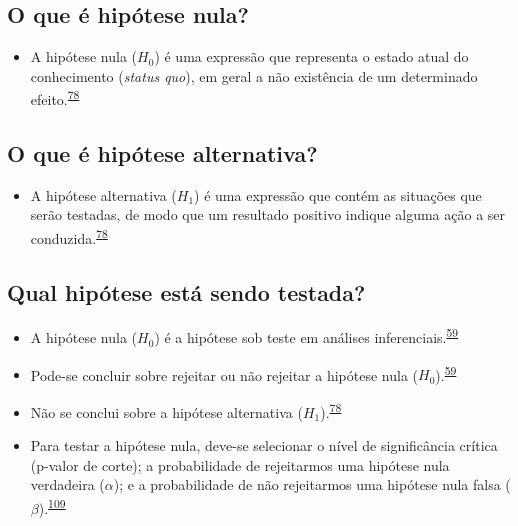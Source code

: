 \documentclass[
  a4paper,
]{book}
\providecommand{\tightlist}{%
  \setlength{\itemsep}{0pt}\setlength{\parskip}{0pt}}
\begin{document}
\hypertarget{o-que-uxe9-hipuxf3tese-nula}{%
\subsection{O que é hipótese nula?}\label{o-que-uxe9-hipuxf3tese-nula}}

\begin{itemize}
\tightlist
\item
  A hipótese nula (\(H_{0}\)) é uma expressão que representa o estado atual do conhecimento (\emph{status quo}), em geral a não existência de um determinado efeito.\textsuperscript{\protect\hyperlink{ref-kanji2006}{78}}
\end{itemize}

\hypertarget{o-que-uxe9-hipuxf3tese-alternativa}{%
\subsection{O que é hipótese alternativa?}\label{o-que-uxe9-hipuxf3tese-alternativa}}

\begin{itemize}
\tightlist
\item
  A hipótese alternativa (\(H_{1}\)) é uma expressão que contém as situações que serão testadas, de modo que um resultado positivo indique alguma ação a ser conduzida.\textsuperscript{\protect\hyperlink{ref-kanji2006}{78}}
\end{itemize}

\hypertarget{qual-hipuxf3tese-estuxe1-sendo-testada}{%
\subsection{Qual hipótese está sendo testada?}\label{qual-hipuxf3tese-estuxe1-sendo-testada}}

\begin{itemize}
\item
  A hipótese nula (\(H_{0}\)) é a hipótese sob teste em análises inferenciais.\textsuperscript{\protect\hyperlink{ref-Ali2016}{59}}
\item
  Pode-se concluir sobre rejeitar ou não rejeitar a hipótese nula (\(H_{0}\)).\textsuperscript{\protect\hyperlink{ref-Ali2016}{59}}
\item
  Não se conclui sobre a hipótese alternativa (\(H_{1}\)).\textsuperscript{\protect\hyperlink{ref-kanji2006}{78}}
\item
  Para testar a hipótese nula, deve-se selecionar o nível de significância crítica (p-valor de corte); a probabilidade de rejeitarmos uma hipótese nula verdadeira (\(\alpha\)); e a probabilidade de não rejeitarmos uma hipótese nula falsa (\(\beta\)).\textsuperscript{\protect\hyperlink{ref-Curran-Everett2009}{109}}
\end{itemize}
\end{document}
